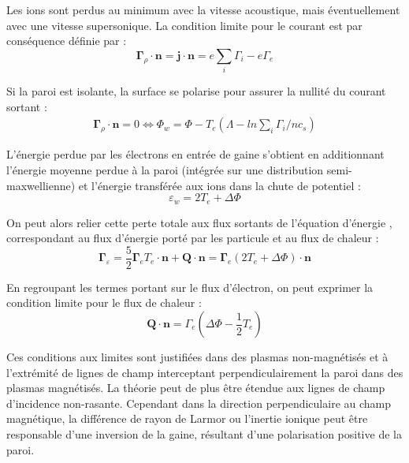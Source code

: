\begin{refsection}
Les ions sont perdus au minimum avec la vitesse acoustique, mais
éventuellement avec une vitesse supersonique. La condition limite pour le
courant est par conséquence définie par :
\begin{equation}
\boldsymbol{\Gamma}_\rho\cdot\mathbf{n}=\mathbf{j}\cdot\mathbf{n}=e\sum_i{\Gamma}_i-e{\Gamma}_e
\end{equation}

Si la paroi est isolante, la surface se polarise pour assurer la nullité du
courant sortant :
\begin{equation}\begin{split}
\boldsymbol{\Gamma}_\rho\cdot\mathbf{n}=0\Leftrightarrow
\Phi_w=\Phi-T_e(\Lambda-ln\sum_i\Gamma_i/nc_s)
\end{split}\end{equation}

L'énergie perdue par les électrons en entrée de gaine s'obtient en
additionnant l'énergie moyenne perdue à la paroi (intégrée sur une distribution
semi-maxwellienne) et l'énergie transférée aux ions dans la chute de potentiel :
\begin{equation}
	\varepsilon_w=2T_e+\Delta \Phi
\end{equation}
 
 On peut alors relier cette perte totale aux flux sortants de l'équation
 d'énergie , correspondant au flux d'énergie porté par les
 particule et au flux de chaleur :
\begin{equation}
\boldsymbol{\Gamma}_\varepsilon=\frac{5}{2}\boldsymbol{\Gamma}_eT_e\cdot\mathbf{n}+\mathbf{Q}\cdot\mathbf{n}=
\boldsymbol{\Gamma}_e\left(2T_e+\Delta\Phi\right)\cdot\mathbf{n}
\end{equation}

En regroupant les termes portant sur le flux d'électron, on peut exprimer la
condition limite pour le flux de chaleur :
\begin{equation}
\mathbf{Q}\cdot\mathbf{n}=\Gamma_e\left(\Delta\Phi-\frac{1}{2}T_e\right)
\end{equation}

Ces conditions aux limites sont justifiées dans des plasmas non-magnétisés et à
l'extrémité de lignes de champ interceptant perpendiculairement la paroi dans
des plasmas magnétisés. La théorie peut de plus être étendue aux lignes de champ
d'incidence non-rasante. Cependant dans la direction perpendiculaire au champ
magnétique, la différence de rayon de Larmor ou l'inertie ionique peut être
responsable d'une inversion de la gaine, résultant d'une polarisation positive
de la paroi.


\end{refsection}
